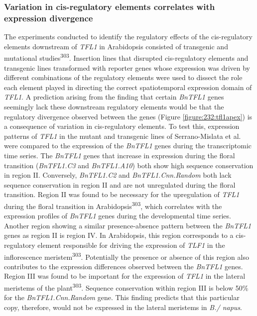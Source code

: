 \documentclass[12pt,]{book}
\begin{document}
\subsubsection{Variation in cis-regulatory elements correlates with
expression divergence}\label{section:spring:tfl1expdivergence}

The experiments conducted to identify the regulatory effects of the
cis-regulatory elements downstream of \emph{TFL1} in Arabidopsis
consisted of transgenic and mutational studies\textsuperscript{303}.
Insertion lines that disrupted cis-regulatory elements and transgenic
lines transformed with reporter genes whose expression was driven by
different combinations of the regulatory elements were used to dissect
the role each element played in directing the correct spatiotemporal
expression domain of \emph{TFL1}. A prediction arising from the finding
that certain \emph{BnTFL1} genes seemingly lack these downstream
regulatory elements would be that the regulatory divergence observed
between the genes (Figure \ref{figure:232:tfl1apex}) is a consequence of
variation in cis-regulatory elements. To test this, expression patterns
of \emph{TFL1} in the mutant and transgenic lines of Serrano-Mislata et
al. were compared to the expression of the \emph{BnTFL1} genes during
the transcriptomic time series. The \emph{BnTFL1} genes that increase in
expression during the floral transition (\emph{BnTFL1.C3} and
\emph{BnTFL1.A10}) both show high sequence conservation in region II.
Conversely, \emph{BnTFL1.C2} and \emph{BnTFL1.Cnn.Random} both lack
sequence conservation in region II and are not unregulated during the
floral transition. Region II was found to be necessary for the
upregulation of \emph{TFL1} during the floral transition in
Arabidopsis\textsuperscript{303}, which correlates with the expression
profiles of \emph{BnTFL1} genes during the developmental time series.
Another region showing a similar presence-absence pattern between the
\emph{BnTFL1} genes as region II is region IV. In Arabidopsis, this
region corresponds to a cis-regulatory element responsible for driving
the expression of \emph{TLF1} in the inflorescence
meristem\textsuperscript{303}. Potentially the presence or absence of
this region also contributes to the expression differences observed
between the \emph{BnTFL1} genes. Region III was found to be important
for the expression of \emph{TFL1} in the lateral meristems of the
plant\textsuperscript{303}. Sequence conservation within region III is
below 50\% for the \emph{BnTFL1.Cnn.Random} gene. This finding predicts
that this particular copy, therefore, would not be expressed in the
lateral meristems in \emph{B./ napus}.
\end{document}
